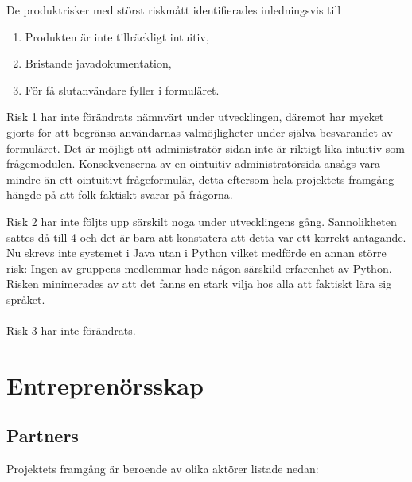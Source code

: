 \documentclass[12pt]{article}
\begin{document}
De produktrisker med störst riskmått identifierades inledningsvis till 

\begin{enumerate}
    \item Produkten är inte tillräckligt intuitiv,
    \item Bristande javadokumentation,
    \item För få slutanvändare fyller i formuläret.
\end{enumerate}

Risk 1 har inte förändrats nämnvärt under utvecklingen, däremot har mycket gjorts för att begränsa användarnas valmöjligheter under själva besvarandet av formuläret. Det är möjligt att administratör sidan inte är riktigt lika intuitiv som frågemodulen. Konsekvenserna av en ointuitiv administratörsida ansågs vara mindre än ett ointuitivt frågeformulär, detta eftersom hela projektets framgång hängde på att folk faktiskt svarar på frågorna. 

Risk 2 har inte följts upp särskilt noga under utvecklingens gång. Sannolikheten sattes då till 4 och det är bara att konstatera att detta var ett korrekt antagande. Nu skrevs inte systemet i Java utan i Python vilket medförde en annan större risk: Ingen av gruppens medlemmar hade någon särskild erfarenhet av Python. Risken minimerades av att det fanns en stark vilja hos alla att faktiskt lära sig språket.\\\\
Risk 3 har inte förändrats. 



\newpage

\section{Entreprenörsskap}
\subsection{Partners}
Projektets framgång är beroende av olika aktörer listade nedan:
\end{document}
